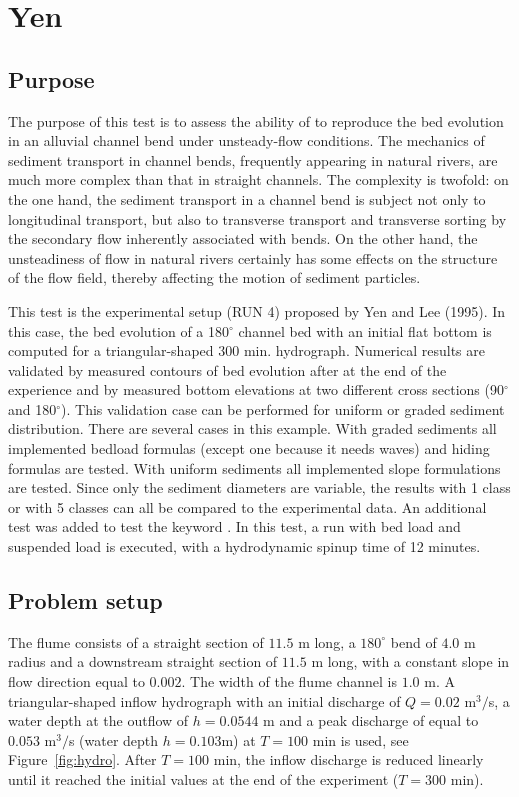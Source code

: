 \chapter{Yen}
%

%
\section{Purpose}
%
The purpose of this test is to assess the ability of \gaia to reproduce the bed evolution in an alluvial channel bend under unsteady-flow conditions.
The mechanics of sediment transport in channel bends, frequently appearing in natural rivers, are much more complex than that in straight channels.
The complexity is twofold: on the one hand, the sediment transport in a channel bend is subject not only to longitudinal transport,
but also to transverse transport and transverse sorting by the secondary flow inherently associated with bends.
On the other hand, the unsteadiness of flow in natural rivers certainly has some effects on the structure of the flow field,
thereby affecting the motion of sediment particles.

This test is the experimental setup (RUN 4) proposed by Yen and Lee (1995).
In this case, the bed evolution of a 180$^{\circ}$ channel bed with an initial flat bottom is computed for a triangular-shaped $300$ min. hydrograph.
Numerical results are validated by measured contours of bed evolution after at the end of the experience and by measured bottom elevations at
two different cross sections (90$^{\circ}$ and 180$^{\circ}$). This validation case can be performed for uniform or graded sediment distribution.
There are several cases in this example. With graded sediments all implemented bedload formulas (except one because it needs waves) and hiding formulas are tested. With uniform sediments all implemented slope formulations are tested.
Since only the sediment diameters are variable, the results with 1 class or with 5 classes can all be compared to the experimental data.
An additional test was added to test the keyword . In this test, a run with bed load and suspended load is executed, with a hydrodynamic spinup time of 12 minutes.
%
\section{Problem setup}
%
The flume consists of a straight section of $11.5$ m long, a $180^{\circ}$ bend of $4.0$ m radius and a downstream straight section of
$11.5$ m long, with a constant slope in flow direction equal to $0.002$. The width of the flume channel is $1.0$ m.
A triangular-shaped inflow hydrograph with an initial discharge of $Q=0.02$ m$^3/$s, a water depth at the outflow of $h = 0.0544$ m
and a peak discharge of equal to $0.053$ m$^3/$s (water depth $h=0.103$m) at $T = 100$ min
is used, see Figure~\ref{fig:hydro}. After $T = 100$ min, the inflow discharge is reduced linearly until
it reached the initial values at the end of the experiment ($T = 300$ min).

